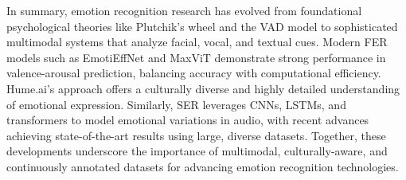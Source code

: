 \par In summary, emotion recognition research has evolved from foundational psychological theories like Plutchik’s wheel and the VAD model to sophisticated multimodal systems that analyze facial, vocal, and textual cues. Modern FER models such as EmotiEffNet and MaxViT demonstrate strong performance in valence-arousal prediction, balancing accuracy with computational efficiency. Hume.ai’s approach offers a culturally diverse and highly detailed understanding of emotional expression. Similarly, SER leverages CNNs, LSTMs, and transformers to model emotional variations in audio, with recent advances achieving state-of-the-art results using large, diverse datasets. Together, these developments underscore the importance of multimodal, culturally-aware, and continuously annotated datasets for advancing emotion recognition technologies.